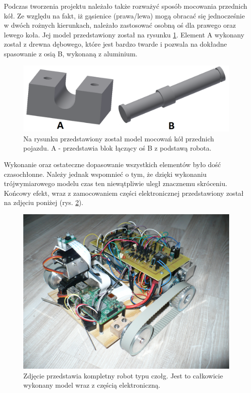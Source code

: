Podczas tworzenia projektu należało także rozważyć sposób mocowania przednich kół. Ze względu na fakt, iż gąsienice (prawa/lewa) mogą obracać się jednocześnie w dwóch rożnych kierunkach, należało zastosować osobną oś dla prawego oraz lewego koła. Jej model przedstawiony został na rysunku \ref{zamocowanie_przod}. Element A wykonany został z drewna dębowego, które jest bardzo twarde i pozwala na dokładne spasowanie z osią B, wykonaną z aluminium.

  \begin{figure}[H]
    \begin{center}
      \includegraphics[scale=0.40]{imgs/moc_kol_prz.png}
 	\caption[Model mocowania kół przednich.]{\small{Na rysunku przedstawiony został model mocowań kół przednich pojazdu. A - przedstawia blok łączący oś B z podstawą robota.}}
	\label{zamocowanie_przod}
    \end{center}
  \end{figure}
Wykonanie oraz ostateczne dopasowanie wszystkich elementów było dość czasochłonne. Należy jednak wspomnieć o tym, że dzięki wykonaniu trójwymiarowego modelu czas ten niewątpliwie uległ znacznemu skróceniu. Końcowy efekt, wraz z zamocowaniem części elektronicznej przedstawiony został na zdjęciu poniżej (rys. \ref{czolg_calosc}).
\newpage
  \begin{figure}[H]
    \begin{center}
      \includegraphics[scale=0.13]{imgs/czolg.jpg}
 	\caption[Zbudowany model.]{\small{Zdjęcie przedstawia kompletny robot typu czołg. Jest to całkowicie wykonany model wraz z częścią elektroniczną.}}
	\label{czolg_calosc}
    \end{center}
  \end{figure}
